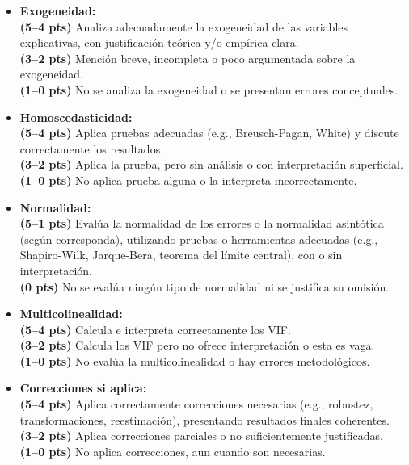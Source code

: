 \documentclass{article}
\begin{document}
\begin{itemize}

  \item \textbf{Exogeneidad:} \\
  \textbf{(5--4 pts)} Analiza adecuadamente la exogeneidad de las variables explicativas, con justificación teórica y/o empírica clara. \\
  \textbf{(3--2 pts)} Mención breve, incompleta o poco argumentada sobre la exogeneidad. \\
  \textbf{(1--0 pts)} No se analiza la exogeneidad o se presentan errores conceptuales.

  \item \textbf{Homoscedasticidad:} \\
  \textbf{(5--4 pts)} Aplica pruebas adecuadas (e.g., Breusch-Pagan, White) y discute correctamente los resultados. \\
  \textbf{(3--2 pts)} Aplica la prueba, pero sin análisis o con interpretación superficial. \\
  \textbf{(1--0 pts)} No aplica prueba alguna o la interpreta incorrectamente.

  \item \textbf{Normalidad:} \\
  \textbf{(5--1 pts)} Evalúa la normalidad de los errores o la normalidad asintótica (según corresponda), utilizando pruebas o herramientas adecuadas (e.g., Shapiro-Wilk, Jarque-Bera, teorema del límite central), con o sin interpretación. \\
  \textbf{(0 pts)} No se evalúa ningún tipo de normalidad ni se justifica su omisión.

  \item \textbf{Multicolinealidad:} \\
  \textbf{(5--4 pts)} Calcula e interpreta correctamente los VIF. \\
  \textbf{(3--2 pts)} Calcula los VIF pero no ofrece interpretación o esta es vaga. \\
  \textbf{(1--0 pts)} No evalúa la multicolinealidad o hay errores metodológicos.

  \item \textbf{Correcciones si aplica:} \\
  \textbf{(5--4 pts)} Aplica correctamente correcciones necesarias (e.g., robustez, transformaciones, reestimación), presentando resultados finales coherentes. \\
  \textbf{(3--2 pts)} Aplica correcciones parciales o no suficientemente justificadas. \\
  \textbf{(1--0 pts)} No aplica correcciones, aun cuando son necesarias.

\end{itemize}
\end{document}
